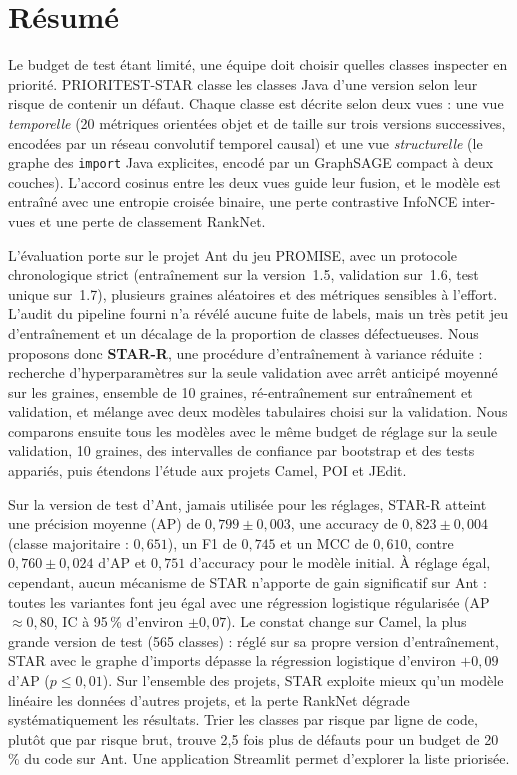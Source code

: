 \documentclass[11pt,a4paper,openany]{report}
\newcommand{\code}[1]{\texttt{\small #1}}
\begin{document}

\chapter*{Résumé}
Le budget de test étant limité, une équipe doit choisir quelles classes inspecter en priorité.
PRIORITEST-STAR classe les classes Java d'une version selon leur risque de contenir un défaut.
Chaque classe est décrite selon deux vues : une vue \emph{temporelle} (20 métriques orientées objet et de taille
sur trois versions successives, encodées par un réseau convolutif temporel causal) et une vue \emph{structurelle}
(le graphe des \code{import} Java explicites, encodé par un GraphSAGE compact à deux couches).
L'accord cosinus entre les deux vues guide leur fusion, et le modèle est entraîné avec une entropie croisée binaire,
une perte contrastive InfoNCE inter-vues et une perte de classement RankNet.

L'évaluation porte sur le projet Ant du jeu PROMISE, avec un protocole chronologique strict (entraînement sur la
version~1.5, validation sur~1.6, test unique sur~1.7), plusieurs graines aléatoires et des métriques sensibles à
l'effort. L'audit du pipeline fourni n'a révélé aucune fuite de labels, mais un très petit jeu d'entraînement et un
décalage de la proportion de classes défectueuses. Nous proposons donc \textbf{STAR-R}, une procédure d'entraînement
à variance réduite : recherche d'hyperparamètres sur la seule validation avec arrêt anticipé moyenné sur les graines,
ensemble de 10 graines, ré-entraînement sur entraînement et validation, et mélange avec deux modèles tabulaires
choisi sur la validation. Nous comparons ensuite tous les modèles avec le même budget de réglage sur la seule
validation, 10 graines, des intervalles de confiance par bootstrap et des tests appariés, puis étendons l'étude aux
projets Camel, POI et JEdit.

Sur la version de test d'Ant, jamais utilisée pour les réglages, STAR-R atteint une précision moyenne (AP) de
$0{,}799\pm0{,}003$, une accuracy de $0{,}823\pm0{,}004$ (classe majoritaire : $0{,}651$), un F1 de $0{,}745$ et un
MCC de $0{,}610$, contre $0{,}760\pm0{,}024$ d'AP et $0{,}751$ d'accuracy pour le modèle initial. À réglage égal,
cependant, aucun mécanisme de STAR n'apporte de gain significatif sur Ant : toutes les variantes font jeu égal avec une
régression logistique régularisée (AP $\approx0{,}80$, IC à 95\,\% d'environ $\pm0{,}07$). Le constat change sur
Camel, la plus grande version de test (565 classes) : réglé sur sa propre version d'entraînement, STAR avec le graphe
d'imports dépasse la régression logistique d'environ $+0{,}09$ d'AP ($p\le0{,}01$). Sur l'ensemble des projets,
STAR exploite mieux qu'un modèle linéaire les données d'autres projets, et la perte RankNet dégrade systématiquement
les résultats. Trier les classes par risque par ligne de code, plutôt que par risque brut, trouve 2,5 fois plus de
défauts pour un budget de 20\,\% du code sur Ant. Une application Streamlit permet d'explorer la liste priorisée.
\end{document}

